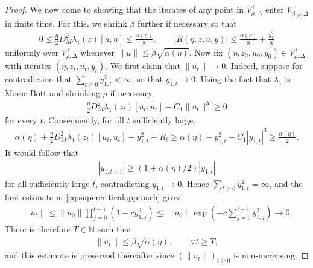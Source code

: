 \documentclass{article}
\newcommand{\NB}{\mathbb{N}}
\theoremstyle{plain}
\theoremstyle{definition}
\theoremstyle{remark}
\begin{document}
\begin{proof}
    We now come to showing that the iterates of any point in $V^+_{\rho,\Delta}$ enter $V^+_{\beta,\rho,\Delta}$ in finite time. For this, we shrink $\beta$ further if necessary so that
    \begin{align}\label{eq:betaeqn}
        0\leq\frac{\eta}{2}D^2_M\lambda_1(z)[u,u]\leq\frac{\alpha(\eta)}{8},
        \qquad
        |R(\eta,z,u,y)|\leq\frac{\alpha(\eta)}{8}+\frac{y_{1}^2}{8}
    \end{align}
    uniformly over $V^+_{\rho,\Delta}$ whenever $\|u\|\leq\beta\sqrt{\alpha(\eta)}$. Now fix $(\eta,z_0,u_0,y_0)\in V^+_{\rho,\Delta}$ with iterates $(\eta,z_t,u_t,y_t)$. We first claim that $\|u_t\|\rightarrow 0$. Indeed, suppose for contradiction that $\sum_{t\geq 0}y_{1,t}^2<\infty$, so that $y_{1,t}\rightarrow 0$. Using the fact that $\lambda_1$ is Morse-Bott and shrinking $\rho$ if necessary,
    \begin{align}
        \frac{\eta}{2}D^2_M\lambda_1(z_t)[u_t,u_t]-C_1\|u_t\|^3\geq 0
    \end{align}
    for every $t$. Consequently, for all $t$ sufficiently large,
    \begin{align}
        \alpha(\eta)+\frac{\eta}{2}D^2_M\lambda_1(z_t)[u_t,u_t]-y_{1,t}^2+R_t
        \geq \alpha(\eta)-y_{1,t}^2-C_1|y_{1,t}|^3
        \geq \frac{\alpha(\eta)}{2}.
    \end{align}
    It would follow that
    \begin{align}
        |y_{1,t+1}|\geq(1+\alpha(\eta)/2)|y_{1,t}|
    \end{align}
    for all sufficiently large $t$, contradicting $y_{1,t}\rightarrow 0$. Hence $\sum_{t\geq 0}y_{1,t}^2=\infty$, and the first estimate in \eqref{eq:supercriticalapproach} gives
    \begin{align}
        \|u_t\|\leq \|u_0\|\prod_{j=0}^{t-1}(1-cy_{1,j}^2)\leq \|u_0\|\exp\left(-c\sum_{j=0}^{t-1}y_{1,j}^2\right)
        \longrightarrow 0.
    \end{align}
    There is therefore $T\in\NB$ such that
    \begin{align}
        \|u_t\|\leq \beta\sqrt{\alpha(\eta)},\qquad \forall t\geq T,
    \end{align}
    and this estimate is preserved thereafter since $(\|u_t\|)_{t\geq 0}$ is non-increasing.


\end{proof}
\end{document}

